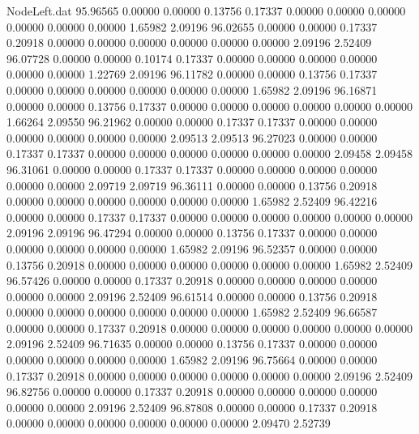 \begin{filecontents}{NodeLeft.dat}
  95.96565    0.00000    0.00000     0.13756    0.17337    0.00000    0.00000    0.00000    0.00000    0.00000    0.00000    1.65982    2.09196
  96.02655    0.00000    0.00000     0.17337    0.20918    0.00000    0.00000    0.00000    0.00000    0.00000    0.00000    2.09196    2.52409
  96.07728    0.00000    0.00000     0.10174    0.17337    0.00000    0.00000    0.00000    0.00000    0.00000    0.00000    1.22769    2.09196
  96.11782    0.00000    0.00000     0.13756    0.17337    0.00000    0.00000    0.00000    0.00000    0.00000    0.00000    1.65982    2.09196
  96.16871    0.00000    0.00000     0.13756    0.17337    0.00000    0.00000    0.00000    0.00000    0.00000    0.00000    1.66264    2.09550
  96.21962    0.00000    0.00000     0.17337    0.17337    0.00000    0.00000    0.00000    0.00000    0.00000    0.00000    2.09513    2.09513
  96.27023    0.00000    0.00000     0.17337    0.17337    0.00000    0.00000    0.00000    0.00000    0.00000    0.00000    2.09458    2.09458
  96.31061    0.00000    0.00000     0.17337    0.17337    0.00000    0.00000    0.00000    0.00000    0.00000    0.00000    2.09719    2.09719
  96.36111    0.00000    0.00000     0.13756    0.20918    0.00000    0.00000    0.00000    0.00000    0.00000    0.00000    1.65982    2.52409
  96.42216    0.00000    0.00000     0.17337    0.17337    0.00000    0.00000    0.00000    0.00000    0.00000    0.00000    2.09196    2.09196
  96.47294    0.00000    0.00000     0.13756    0.17337    0.00000    0.00000    0.00000    0.00000    0.00000    0.00000    1.65982    2.09196
  96.52357    0.00000    0.00000     0.13756    0.20918    0.00000    0.00000    0.00000    0.00000    0.00000    0.00000    1.65982    2.52409
  96.57426    0.00000    0.00000     0.17337    0.20918    0.00000    0.00000    0.00000    0.00000    0.00000    0.00000    2.09196    2.52409
  96.61514    0.00000    0.00000     0.13756    0.20918    0.00000    0.00000    0.00000    0.00000    0.00000    0.00000    1.65982    2.52409
  96.66587    0.00000    0.00000     0.17337    0.20918    0.00000    0.00000    0.00000    0.00000    0.00000    0.00000    2.09196    2.52409
  96.71635    0.00000    0.00000     0.13756    0.17337    0.00000    0.00000    0.00000    0.00000    0.00000    0.00000    1.65982    2.09196
  96.75664    0.00000    0.00000     0.17337    0.20918    0.00000    0.00000    0.00000    0.00000    0.00000    0.00000    2.09196    2.52409
  96.82756    0.00000    0.00000     0.17337    0.20918    0.00000    0.00000    0.00000    0.00000    0.00000    0.00000    2.09196    2.52409
  96.87808    0.00000    0.00000     0.17337    0.20918    0.00000    0.00000    0.00000    0.00000    0.00000    0.00000    2.09470    2.52739

\end{filecontents}
